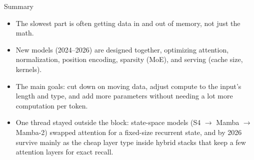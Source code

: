 \begin{frame}{Summary}
  \begin{itemize}
    \item The slowest part is often getting data in and out of memory, not just the math.
    \item New models (2024--2026) are designed together, optimizing attention, normalization, position encoding, sparsity (MoE), and serving (cache size, kernels).
    \item The main goals: cut down on moving data, adjust compute to the input's length and type, and add more parameters without needing a lot more computation per token.
    \item One thread stayed outside the block: state-space models (S4 $\to$ Mamba $\to$ Mamba-2) swapped attention for a fixed-size recurrent state, and by 2026 survive mainly as the cheap layer type inside hybrid stacks that keep a few attention layers for exact recall.
  \end{itemize}
\end{frame}
